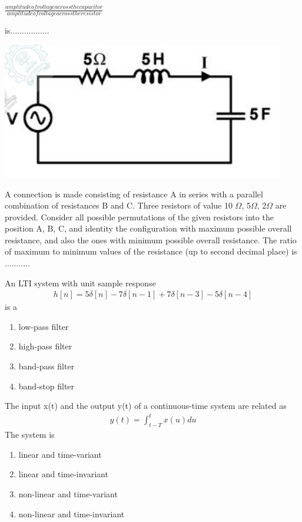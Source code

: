 $\frac{amplitude of voltage across the capacitor}{amplitude of voltage across the resistor}$

is.................

\includegraphics[scale=0.4]{5}

\item A connection is made consisting of resistance A in series with a parallel combination of resistances B and C. Three resistors of value 10 $\Omega$, 5$\Omega$, 2$\Omega$ are provided. Consider all possible permutations of the given resistors into the position A, B, C, and identity the configuration with maximum possible overall resistance, and also the ones with minimum possible overall resistance. The ratio of maximum to minimum values of the resistance (up to second decimal place) is ...........

\item An LTI system with unit sample response 
\begin{align*}
h[n] = 5\delta[n] - 7\delta[n - 1] + 7\delta[n - 3] - 5\delta[n - 4]
\end{align*}
 is a
\begin{enumerate}
\item low-pass filter
\item high-pass filter
\item band-pass filter
\item band-stop filter
\end{enumerate}

\item The input x(t) and the output y(t) of a continuous-time system are related as 
\begin{align}
y(t) = \int_{t - T}^{t}x(u)du
\end{align}
The system is 
\begin{enumerate}
\item linear and time-variant 
\item linear and time-invariant
\item non-linear and time-variant
\item non-linear and time-invariant
\end{enumerate}

